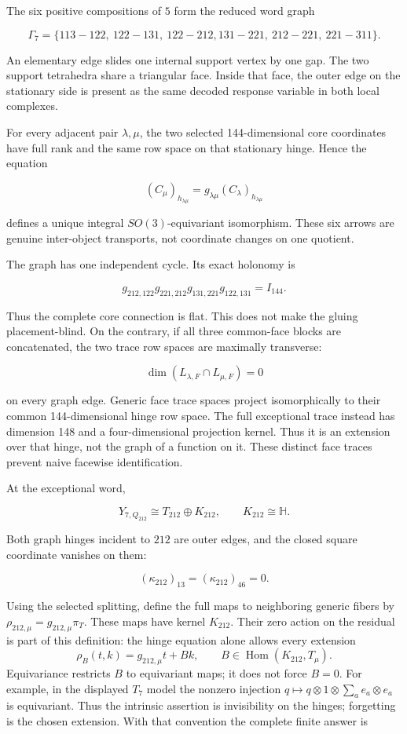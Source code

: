 \documentclass[
  11pt,
  a4paper,
]{article}
\begin{document}
The six positive compositions of \(5\) form the reduced word graph

\[
\Gamma_7
=
\{113\!-\!122,\ 122\!-\!131,\ 122\!-\!212,
131\!-\!221,\ 212\!-\!221,\ 221\!-\!311\}.
\tag{10.1}
\]

An elementary edge slides one internal support vertex by one gap. The
two support tetrahedra share a triangular face. Inside that face, the
outer edge on the stationary side is present as the same decoded
response variable in both local complexes.

For every adjacent pair \(\lambda,\mu\), the two selected
144-dimensional core coordinates have full rank and the same row space
on that stationary hinge. Hence the equation

\[
\boxed{
(C_\mu)_{h_{\lambda\mu}}
=g_{\lambda\mu}(C_\lambda)_{h_{\lambda\mu}}
}
\tag{10.2}
\]

defines a unique integral \(SO(3)\)-equivariant isomorphism. These six
arrows are genuine inter-object transports, not coordinate changes on
one quotient.

The graph has one independent cycle. Its exact holonomy is

\[
\boxed{
g_{212,122}g_{221,212}g_{131,221}g_{122,131}
=I_{144}.
}
\tag{10.3}
\]

Thus the complete core connection is flat. This does not make the gluing
placement-blind. On the contrary, if all three common-face blocks are
concatenated, the two trace row spaces are maximally transverse:

\[
\dim(L_{\lambda,F}\cap L_{\mu,F})=0
\tag{10.4}
\]

on every graph edge. Generic face trace spaces project isomorphically to
their common 144-dimensional hinge row space. The full exceptional trace
instead has dimension 148 and a four-dimensional projection kernel. Thus
it is an extension over that hinge, not the graph of a function on it.
These distinct face traces prevent naive facewise identification.

At the exceptional word,

\[
Y_{7,Q_{212}}\cong T_{212}\oplus K_{212},
\qquad K_{212}\cong\mathbb H.
\tag{10.5}
\]

Both graph hinges incident to \(212\) are outer edges, and the closed
square coordinate vanishes on them:

\[
(\kappa_{212})_{13}=(\kappa_{212})_{46}=0.
\tag{10.6}
\]

Using the selected splitting, define the full maps to neighboring
generic fibers by \(\rho_{212,\mu}=g_{212,\mu}\pi_T\). These maps have
kernel \(K_{212}\). Their zero action on the residual is part of this
definition: the hinge equation alone allows every extension \[
 \rho_B(t,k)=g_{212,\mu}t+B k,\qquad
 B\in\operatorname{Hom}(K_{212},T_\mu).
\] Equivariance restricts \(B\) to equivariant maps; it does not force
\(B=0\). For example, in the displayed \(T_7\) model the nonzero
injection \(q\mapsto q\otimes1\otimes\sum_a e_a\otimes e_a\) is
equivariant. Thus the intrinsic assertion is invisibility on the hinges;
forgetting is the chosen extension. With that convention the complete
finite answer is
\end{document}
